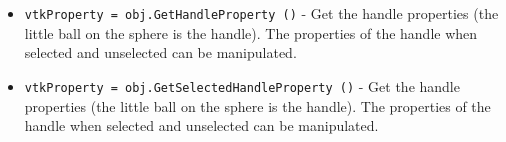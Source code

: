 \begin{itemize}
\item  \verb|vtkProperty = obj.GetHandleProperty ()| -  Get the handle properties (the little ball on the sphere is the
 handle). The properties of the handle when selected and unselected
 can be  manipulated.

\item  \verb|vtkProperty = obj.GetSelectedHandleProperty ()| -  Get the handle properties (the little ball on the sphere is the
 handle). The properties of the handle when selected and unselected
 can be  manipulated.

\end{itemize}
